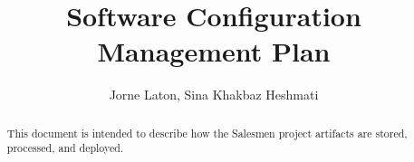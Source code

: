 \documentclass{report}
\author{Jorne Laton, Sina Khakbaz Heshmati}
\title{Software Configuration Management Plan}
\begin{document}
\maketitle
\tableofcontents

\begin{abstract}
This document is intended to describe how the Salesmen project artifacts
are stored, processed, and deployed.
\end{abstract}









\end{document}
